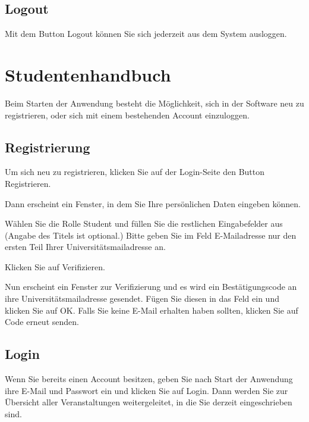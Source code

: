 \documentclass{Handbuch}
\begin{document}
\subsection{Logout}
Mit dem Button \frqq Logout\flqq{} können Sie sich jederzeit aus dem System ausloggen.


\newpage
\section{Studentenhandbuch}
Beim Starten der Anwendung besteht die Möglichkeit, sich in der Software neu zu registrieren, oder sich mit einem bestehenden Account einzuloggen.

\subsection{Registrierung}
Um sich neu zu registrieren, klicken Sie auf der Login-Seite den Button \frqq Registrieren\flqq{}. 
\begin{center}
\end{center}
Dann erscheint ein Fenster, in dem Sie Ihre persönlichen Daten eingeben können. 
\begin{center}
\end{center}
Wählen Sie die Rolle \glqq Student\grqq{} und füllen Sie die restlichen Eingabefelder aus (Angabe des Titels ist optional.) Bitte geben Sie im Feld \glqq E-Mailadresse\grqq{} nur den ersten Teil Ihrer Universitätsmailadresse an.
\begin{center}
\end{center}
Klicken Sie auf \frqq Verifizieren\flqq. 
\begin{center}
\end{center}
Nun erscheint ein Fenster zur Verifizierung und es wird ein Bestätigungscode an ihre Universitätsmailadresse gesendet. Fügen Sie diesen in das Feld ein und klicken Sie auf \frqq OK\flqq.
Falls Sie keine E-Mail erhalten haben sollten, klicken Sie auf \frqq Code erneut senden\flqq. 

\subsection{Login}
Wenn Sie bereits einen Account besitzen, geben Sie nach Start der Anwendung ihre E-Mail und Passwort ein und klicken Sie auf \frqq Login\flqq. Dann werden Sie zur Übersicht aller Veranstaltungen weitergeleitet, in die Sie derzeit eingeschrieben sind. 
\end{document}
